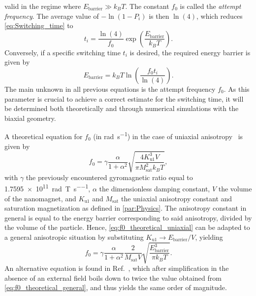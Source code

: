 \documentclass[11pt,a4paper,english,twoside]{article}
\begin{document}
valid in the regime where $E_\mathrm{barrier} \gg k_B T$. The constant $f_0$ is called the \textit{attempt frequency}. The average value of $-\ln(1-P_i)$ is then $\ln(4)$, which reduces \eqref{eq:Switching_time} to
\begin{equation}
    t_i = \frac{\ln(4)}{f_0} \exp(\frac{E_\mathrm{barrier}}{k_B T})  \mathrm{.}
    \label{eq:Switching_time_average}
\end{equation}
Conversely, if a specific switching time $t_i$ is desired, the required energy barrier is given by
\begin{equation}
    E_\mathrm{barrier} = k_B T \ln(\frac{f_0 t_i}{\ln(4)}) \mathrm{.}
\end{equation}
The main unknown in all previous equations is the attempt frequency $f_0$. As this parameter is crucial to achieve a correct estimate for the switching time, it will be determined both theoretically and through numerical simulations with the biaxial geometry. \par
A theoretical equation for $f_0$ (in \si{\radian\per\second}) in the case of uniaxial anisotropy~\cite{MuMax3, LEL-17b, f0_mumax3_reference} is given by
\begin{equation}
    f_0 = \gamma \frac{\alpha}{1+\alpha^2} \sqrt{\frac{4 K_\mathrm{u1}^3 V}{\pi M_\mathrm{sat}^2 k_B T}} \mathrm{,}
    \label{eq:f0_theoretical_uniaxial}
\end{equation}
with $\gamma$ the previously encountered gyromagnetic ratio equal to \SI{1.7595e11}{\radian\per\tesla\per\second}, $\alpha$ the dimensionless damping constant, $V$ the volume of the nanomagnet, and $K_\mathrm{u1}$ and $M_\mathrm{sat}$ the uniaxial anisotropy constant and saturation magnetization as defined in \cref{par:Physics}. The anisotropy constant in general is equal to the energy barrier corresponding to said anisotropy, divided by the volume of the particle. Hence, \eqref{eq:f0_theoretical_uniaxial} can be adapted to a general anisotropic situation by substituting $K_\mathrm{u1} \rightarrow E_\mathrm{barrier}/V$, yielding
\begin{equation}
    f_0 = \gamma \frac{\alpha}{1+\alpha^2} \frac{2}{M_\mathrm{sat} V} \sqrt{\frac{E_\mathrm{barrier}^3}{\pi k_B T}} \mathrm{.}
    \label{eq:f0_theoretical_general}
\end{equation}
An alternative equation is found in Ref.~\cite{f0_alternative_Jonathan}, which after simplification in the absence of an external field boils down to twice the value obtained from \eqref{eq:f0_theoretical_general}, and thus yields the same order of magnitude. \par
\end{document}
